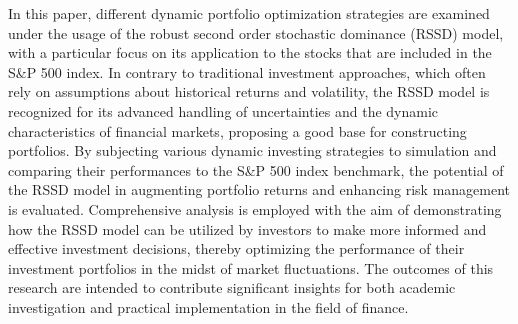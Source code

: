 
\begin{Abstrakt}
    In this paper, different dynamic portfolio optimization strategies are examined under the usage of the robust second order stochastic dominance (RSSD) model, with a particular focus on its application to the stocks that are included in the S\&P 500 index. In contrary to traditional investment approaches, which often rely on assumptions about historical returns and volatility, the RSSD model is recognized for its advanced handling of uncertainties and the dynamic characteristics of financial markets, proposing a good base for constructing portfolios. By subjecting various dynamic investing strategies to simulation and comparing their performances to the S\&P 500 index benchmark, the potential of the RSSD model in augmenting portfolio returns and enhancing risk management is evaluated. Comprehensive analysis is employed with the aim of demonstrating how the RSSD model can be utilized by investors to make more informed and effective investment decisions, thereby optimizing the performance of their investment portfolios in the midst of market fluctuations. The outcomes of this research are intended to contribute significant insights for both academic investigation and practical implementation in the field of finance.
\end{Abstrakt}



\clearpage